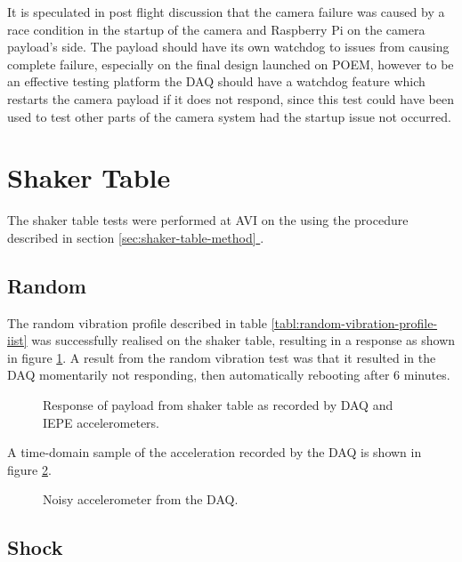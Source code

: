 \documentclass{report}
\newcommand*{\secref}[1]{section \hyperref[{#1}]{\ref*{#1} \nameref*{#1}}}
\begin{document}
It is speculated in post flight discussion that the camera failure was caused by a race condition in the startup of the camera and Raspberry Pi on the camera payload's side. The payload should have its own watchdog to issues from causing complete failure, especially on the final design launched on POEM, however to be an effective testing platform the DAQ should have a watchdog feature which restarts the camera payload if it does not respond, since this test could have been used to test other parts of the camera system had the startup issue not occurred.

\section{Shaker Table}

The shaker table tests were performed at AVI on the  using the procedure described in \secref{sec:shaker-table-method}.

\subsection{Random}

The random vibration profile described in table \ref{tabl:random-vibration-profile-iist} was successfully realised on the shaker table, resulting in a response as shown in figure \ref{fig:random-table-resp}. A result from the random vibration test was that it resulted in the DAQ momentarily not responding, then automatically rebooting after 6 minutes.

\begin{figure}[H]
  \centering
  
  \caption{Response of payload from shaker table as recorded by DAQ and IEPE accelerometers.}
  \label{fig:random-table-resp}
\end{figure}

A time-domain sample of the acceleration recorded by the DAQ is shown in figure \ref{fig:noisy-daq}.

\begin{figure}[H]
  \centering
  
  \caption{Noisy accelerometer from the DAQ.}
  \label{fig:noisy-daq}
\end{figure}

\subsection{Shock}
\end{document}
